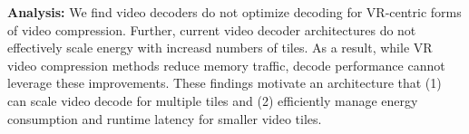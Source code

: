 \textbf{Analysis: } We find video decoders do not optimize decoding for VR-centric forms of video compression.
Further, current video decoder architectures do not effectively scale energy with increasd numbers of tiles.
As a result, while VR video compression methods reduce memory traffic, decode performance cannot leverage these improvements.
These findings motivate an architecture that (1) can scale video decode for multiple tiles and (2) efficiently manage energy consumption and runtime latency for smaller video tiles.
